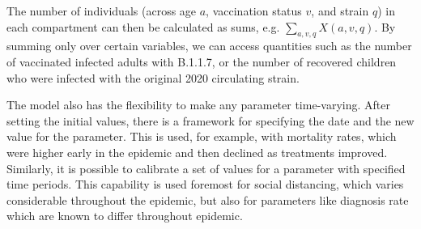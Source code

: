 \documentclass[11pt]{article}
\begin{document}
The number of individuals (across age $a$, vaccination status $v$, and strain $q$) in each compartment can then be calculated as sums, e.g. $\sum_{a,v,q} X(a,v,q)$. By summing only over certain variables, we can access quantities such as the number of vaccinated infected adults with B.1.1.7, or the number of recovered children who were infected with the original 2020 circulating strain. 

The model also has the flexibility to make any parameter time-varying. After setting the initial values, there is a framework for specifying the date and the new value for the parameter. This is used, for example, with mortality rates, which were higher early in the epidemic and then declined as treatments improved. Similarly, it is possible to calibrate a set of values for a parameter with specified time periods. This capability is used foremost for social distancing, which varies considerable throughout the epidemic, but also for parameters like diagnosis rate which are known to differ throughout epidemic.
\end{document}
